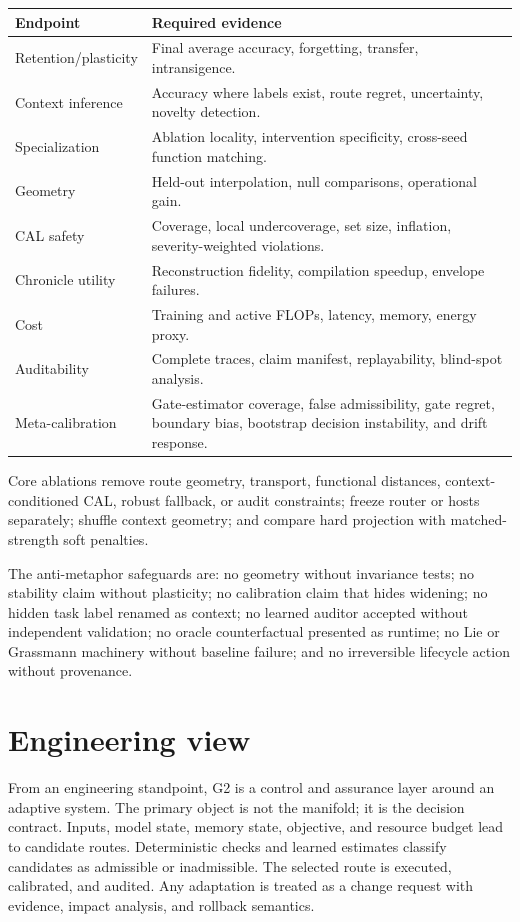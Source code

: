 \documentclass[11pt,a4paper]{article}
\begin{document}
\begin{longtable}{p{}p{}}
\toprule Endpoint & Required evidence \\ \midrule
Retention/plasticity & Final average accuracy, forgetting, transfer, intransigence.\\
Context inference & Accuracy where labels exist, route regret, uncertainty, novelty detection.\\
Specialization & Ablation locality, intervention specificity, cross-seed function matching.\\
Geometry & Held-out interpolation, null comparisons, operational gain.\\
CAL safety & Coverage, local undercoverage, set size, inflation, severity-weighted violations.\\
Chronicle utility & Reconstruction fidelity, compilation speedup, envelope failures.\\
Cost & Training and active FLOPs, latency, memory, energy proxy.\\
Auditability & Complete traces, claim manifest, replayability, blind-spot analysis.\\
Meta-calibration & Gate-estimator coverage, false admissibility, gate regret, boundary bias, bootstrap decision instability, and drift response.\\
\bottomrule
\end{longtable}

Core ablations remove route geometry, transport, functional distances, context-conditioned CAL, robust fallback, or audit constraints; freeze router or hosts separately; shuffle context geometry; and compare hard projection with matched-strength soft penalties.

The anti-metaphor safeguards are: no geometry without invariance tests; no stability claim without plasticity; no calibration claim that hides widening; no hidden task label renamed as context; no learned auditor accepted without independent validation; no oracle counterfactual presented as runtime; no Lie or Grassmann machinery without baseline failure; and no irreversible lifecycle action without provenance.

\section{Engineering view}
From an engineering standpoint, G2 is a control and assurance layer around an adaptive system. The primary object is not the manifold; it is the decision contract. Inputs, model state, memory state, objective, and resource budget lead to candidate routes. Deterministic checks and learned estimates classify candidates as admissible or inadmissible. The selected route is executed, calibrated, and audited. Any adaptation is treated as a change request with evidence, impact analysis, and rollback semantics.
\end{document}
